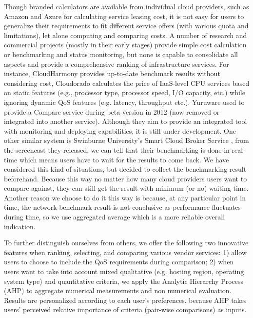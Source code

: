 \documentclass[journal]{IEEEtran}
\begin{document}
Though branded calculators are available from individual cloud providers, such as Amazon \cite{ref21} and Azure \cite{ref22} for calculating service leasing cost, it is not easy for users to generalize their requirements to fit different service offers (with various quota and limitations), let alone computing and comparing costs. A number of research    \cite{li2010cloudcmp} and commercial projects (mostly in their early stages) provide simple cost calculation or benchmarking and status monitoring, but none is capable to consolidate all aspects and provide a comprehensive ranking of infrastructure services. For instance, CloudHarmony \cite{ref24} provides up-to-date benchmark results without considering cost, Cloudorado \cite{ref25} calculates the price of IaaS-level CPU services based on static features (e.g., processor type, processor speed, I/O capacity, etc.) while ignoring dynamic QoS features (e.g. latency, throughput etc.). Yuruware \cite{ref26} used to provide a Compare service during beta version in 2012 (now removed or integrated into another service). Although they aim to provide an integrated tool with monitoring and deploying capabilities, it is still under development. One other similar system is Swinburne University's Smart Cloud Broker Service \cite{ref27}, from the screencast they released, we can tell that their benchmarking is done in real-time which means users have to wait for the results to come back. We have considered this kind of situations, but decided to collect the benchmarking result beforehand. Because this way no matter how many cloud providers users want to compare against, they can still get the result with minimum (or no) waiting time. Another reason we choose to do it this way is because, at any particular point in time, the network benchmark result is not conclusive as performance fluctuates during time, so we use aggregated average which is a more reliable overall indication.

To further distinguish ourselves from others, we offer the following two innovative features when ranking, selecting, and comparing various vendor services: 1) allow users to choose to include the QoS requirements during comparison; 2) when users want to take into account mixed qualitative (e.g. hosting region, operating system type) and quantitative criteria, we apply the Analytic Hierarchy Process (AHP) to aggregate numerical measurements and non numerical evaluation. Results are personalized according to each user's preferences, because AHP takes users' perceived relative importance of criteria (pair-wise comparisons) as inputs.
\end{document}
